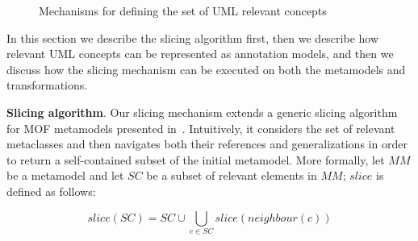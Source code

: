 \begin{figure}
	\hspace{2mm}
  \caption{Mechanisms for defining the set of UML relevant concepts}
  \label{fig:slicingIdea}
\end{figure}
%
\vspace{-.4cm}
In this section we describe the slicing algorithm first, then we describe how relevant UML concepts can be represented as annotation models, 
and then we discuss how the slicing mechanism can be executed on both the  metamodels and transformations.

\textbf{Slicing algorithm}. Our slicing mechanism
extends a generic slicing algorithm for MOF metamodels presented in~\cite{ICSEbyadl}. Intuitively,
it considers the set of relevant metaclasses and then navigates both their references and generalizations in order
to return a self-contained subset of the initial metamodel.
More formally, let $MM$ be a metamodel and let $SC$ be a subset of relevant elements in
$MM$; $slice$ is defined as follows:

\vspace{-.2cm}
$$slice(SC)=SC \cup \displaystyle\bigcup_{c \in
SC}{slice(neighbour(c))}$$
\vspace{-.2cm}

